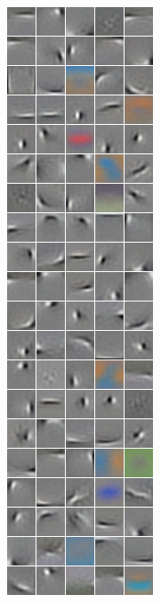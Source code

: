 {\begin{figure}
\begin{subfigure}[b]{0.225\textwidth}
\includegraphics[width=\x, height=\y]{./figures/SATAE/CIFAR_shrink01.png} \caption{}
\end{subfigure} \begin{subfigure}[b]{0.225\textwidth} \centering

\end{subfigure}
\end{figure}}
